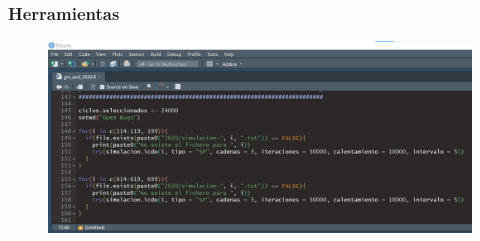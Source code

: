 \documentclass{beamer}
\begin{document}

\begin{frame}\frametitle{Herramientas}
	\begin{figure}
		\centering
		\includegraphics[width=.95\textwidth]{images/r1.png}
	\end{figure}
\end{frame}

\end{document}
